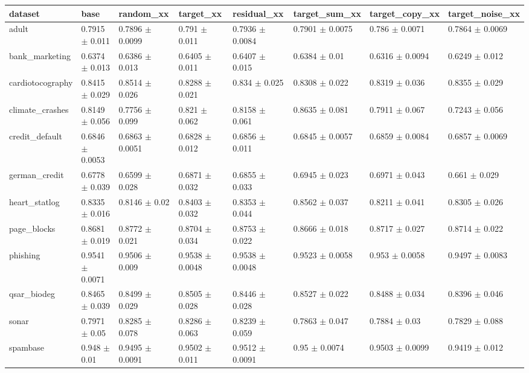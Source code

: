 \begin{tabular}{llllllll}
\toprule
dataset & base & random\_xx & target\_xx & residual\_xx & target\_sum\_xx & target\_copy\_xx & target\_noise\_xx \\
\midrule
adult & 0.7915 $\pm$ 0.011 & 0.7896 $\pm$ 0.0099 & 0.791 $\pm$ 0.011 & 0.7936 $\pm$ 0.0084 & 0.7901 $\pm$ 0.0075 & 0.786 $\pm$ 0.0071 & 0.7864 $\pm$ 0.0069 \\
bank\_marketing & 0.6374 $\pm$ 0.013 & 0.6386 $\pm$ 0.013 & 0.6405 $\pm$ 0.011 & 0.6407 $\pm$ 0.015 & 0.6384 $\pm$ 0.01 & 0.6316 $\pm$ 0.0094 & 0.6249 $\pm$ 0.012 \\
cardiotocography & 0.8415 $\pm$ 0.029 & 0.8514 $\pm$ 0.026 & 0.8288 $\pm$ 0.021 & 0.834 $\pm$ 0.025 & 0.8308 $\pm$ 0.022 & 0.8319 $\pm$ 0.036 & 0.8355 $\pm$ 0.029 \\
climate\_crashes & 0.8149 $\pm$ 0.056 & 0.7756 $\pm$ 0.099 & 0.821 $\pm$ 0.062 & 0.8158 $\pm$ 0.061 & 0.8635 $\pm$ 0.081 & 0.7911 $\pm$ 0.067 & 0.7243 $\pm$ 0.056 \\
credit\_default & 0.6846 $\pm$ 0.0053 & 0.6863 $\pm$ 0.0051 & 0.6828 $\pm$ 0.012 & 0.6856 $\pm$ 0.011 & 0.6845 $\pm$ 0.0057 & 0.6859 $\pm$ 0.0084 & 0.6857 $\pm$ 0.0069 \\
german\_credit & 0.6778 $\pm$ 0.039 & 0.6599 $\pm$ 0.028 & 0.6871 $\pm$ 0.032 & 0.6855 $\pm$ 0.033 & 0.6945 $\pm$ 0.023 & 0.6971 $\pm$ 0.043 & 0.661 $\pm$ 0.029 \\
heart\_statlog & 0.8335 $\pm$ 0.016 & 0.8146 $\pm$ 0.02 & 0.8403 $\pm$ 0.032 & 0.8353 $\pm$ 0.044 & 0.8562 $\pm$ 0.037 & 0.8211 $\pm$ 0.041 & 0.8305 $\pm$ 0.026 \\
page\_blocks & 0.8681 $\pm$ 0.019 & 0.8772 $\pm$ 0.021 & 0.8704 $\pm$ 0.034 & 0.8753 $\pm$ 0.022 & 0.8666 $\pm$ 0.018 & 0.8717 $\pm$ 0.027 & 0.8714 $\pm$ 0.022 \\
phishing & 0.9541 $\pm$ 0.0071 & 0.9506 $\pm$ 0.009 & 0.9538 $\pm$ 0.0048 & 0.9538 $\pm$ 0.0048 & 0.9523 $\pm$ 0.0058 & 0.953 $\pm$ 0.0058 & 0.9497 $\pm$ 0.0083 \\
qsar\_biodeg & 0.8465 $\pm$ 0.039 & 0.8499 $\pm$ 0.029 & 0.8505 $\pm$ 0.028 & 0.8446 $\pm$ 0.028 & 0.8527 $\pm$ 0.022 & 0.8488 $\pm$ 0.034 & 0.8396 $\pm$ 0.046 \\
sonar & 0.7971 $\pm$ 0.05 & 0.8285 $\pm$ 0.078 & 0.8286 $\pm$ 0.063 & 0.8239 $\pm$ 0.059 & 0.7863 $\pm$ 0.047 & 0.7884 $\pm$ 0.03 & 0.7829 $\pm$ 0.088 \\
spambase & 0.948 $\pm$ 0.01 & 0.9495 $\pm$ 0.0091 & 0.9502 $\pm$ 0.011 & 0.9512 $\pm$ 0.0091 & 0.95 $\pm$ 0.0074 & 0.9503 $\pm$ 0.0099 & 0.9419 $\pm$ 0.012 \\

\end{tabular}
